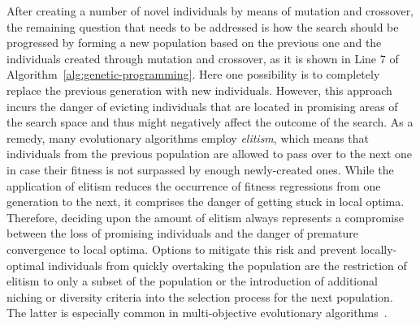 After creating a number of novel individuals by means of mutation and crossover, the remaining question that needs to be addressed is how the search should be progressed by forming a new population based on the previous one and the individuals created through mutation and crossover, as it is shown in Line 7 of Algorithm~\ref{alg:genetic-programming}.
Here one possibility is to completely replace the previous generation with new individuals.
However, this approach incurs the danger of evicting individuals that are located in promising areas of the search space and thus might negatively affect the outcome of the search.
As a remedy, many evolutionary algorithms employ \emph{elitism}, which means that individuals from the previous population are allowed to pass over to the next one in case their fitness is not surpassed by enough newly-created ones.
While the application of elitism reduces the occurrence of fitness regressions from one generation to the next, it comprises the danger of getting stuck in local optima.
Therefore, deciding upon the amount of elitism always represents a compromise between the loss of promising individuals and the danger of premature convergence to local optima.
Options to mitigate this risk and prevent locally-optimal individuals from quickly overtaking the population are the restriction of elitism to only a subset of the population or the introduction of additional niching or diversity criteria into the selection process for the next population. 
The latter is especially common in multi-objective evolutionary algorithms~\cite{coello2007evolutionary}.